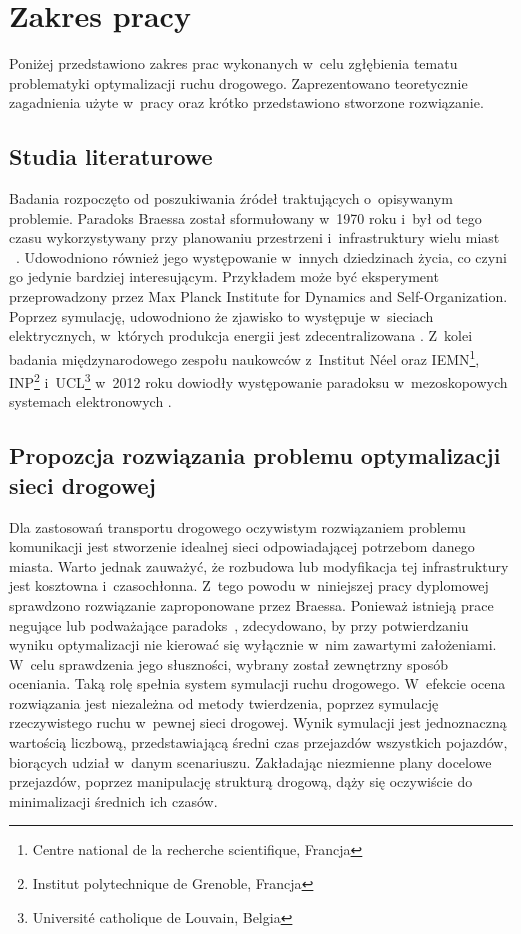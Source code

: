 \documentclass[twoside,12pt]{report}
\begin{document}
\section{Zakres pracy}
Poniżej przedstawiono zakres prac wykonanych w~celu zgłębienia tematu problematyki optymalizacji ruchu drogowego. Zaprezentowano teoretycznie zagadnienia użyte w~pracy oraz krótko przedstawiono stworzone rozwiązanie. 

\subsection{Studia literaturowe}
Badania rozpoczęto od poszukiwania źródeł traktujących o~opisywanym problemie. Paradoks Braessa został sformułowany w~1970 roku i~był od tego czasu wykorzystywany przy planowaniu przestrzeni i~infrastruktury wielu miast ~\cite{urban}. Udowodniono również jego występowanie w~innych dziedzinach życia, co czyni go jedynie bardziej interesującym. Przykładem może być eksperyment przeprowadzony przez Max Planck Institute for Dynamics and Self-Organization. Poprzez symulację, udowodniono że zjawisko to występuje w~sieciach elektrycznych, w~których produkcja energii jest zdecentralizowana \cite{elektrony}. Z~kolei badania międzynarodowego zespołu naukowców z~Institut Néel oraz IEMN\footnote{Centre national de la recherche scientifique, Francja}, INP\footnote{Institut polytechnique de Grenoble, Francja} i~UCL\footnote{Université catholique de Louvain, Belgia} w~2012 roku dowiodły występowanie paradoksu w~mezoskopowych systemach elektronowych \cite{nanoskopia}. 

\subsection{Propozcja rozwiązania problemu optymalizacji sieci drogowej}
Dla zastosowań transportu drogowego oczywistym rozwiązaniem problemu komunikacji jest stworzenie idealnej sieci odpowiadającej potrzebom danego miasta. Warto jednak zauważyć, że rozbudowa lub modyfikacja tej infrastruktury jest kosztowna i~czasochłonna.  Z~tego powodu w~niniejszej pracy dyplomowej sprawdzono rozwiązanie zaproponowane przez Braessa. Ponieważ istnieją prace negujące lub podważające paradoks~\cite{newinsights}, zdecydowano, by przy potwierdzaniu wyniku optymalizacji nie kierować się wyłącznie w~nim zawartymi założeniami. W~celu sprawdzenia jego słuszności, wybrany został zewnętrzny sposób oceniania. Taką rolę spełnia system symulacji ruchu drogowego. W~efekcie ocena rozwiązania jest niezależna od metody twierdzenia, poprzez symulację rzeczywistego ruchu w~pewnej sieci drogowej. Wynik symulacji jest jednoznaczną wartością liczbową, przedstawiającą średni czas przejazdów wszystkich pojazdów, biorących udział w~danym scenariuszu. Zakładając niezmienne plany docelowe przejazdów, poprzez manipulację strukturą drogową, dąży się oczywiście do minimalizacji średnich ich czasów.
\end{document}
